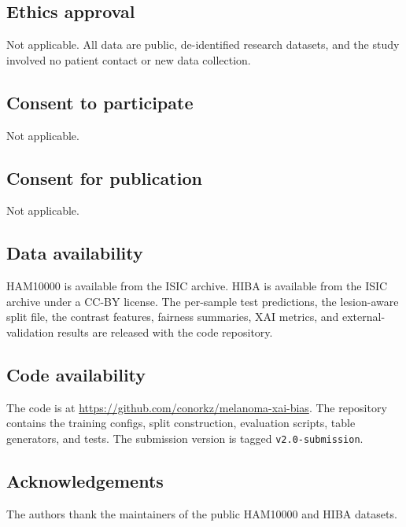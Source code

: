 \documentclass[11pt]{article}
\begin{document}
\subsection*{Ethics approval}
Not applicable. All data are public, de-identified research datasets, and the study involved no patient contact or new data collection.

\subsection*{Consent to participate}
Not applicable.

\subsection*{Consent for publication}
Not applicable.

\subsection*{Data availability}
HAM10000 is available from the ISIC archive. HIBA is available from the ISIC archive under a CC-BY license. The per-sample test predictions, the lesion-aware split file, the contrast features, fairness summaries, XAI metrics, and external-validation results are released with the code repository.

\subsection*{Code availability}
The code is at \url{https://github.com/conorkz/melanoma-xai-bias}. The repository contains the training configs, split construction, evaluation scripts, table generators, and tests. The submission version is tagged \texttt{v2.0-submission}.

\subsection*{Acknowledgements}
The authors thank the maintainers of the public HAM10000 and HIBA datasets.
\end{document}
